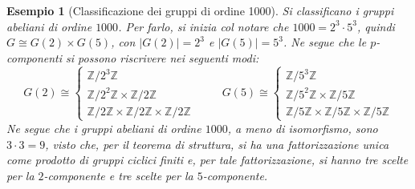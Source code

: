\documentclass[11pt]{article}
\theoremstyle{style}
\newtheorem{esempio}{Esempio}[section]
\numberwithin{equation}{subsection}
\begin{document}
\begin{esempio}
	[Classificazione dei gruppi di ordine 1000]
Si classificano i gruppi abeliani di ordine $1000$.
Per farlo, si inizia col notare che $1000 = 2^3 \cdot 5^3$, quindi $G \cong G(2) \times G(5)$, con $\lvert G(2) \rvert = 2^3$ e $\lvert G(5) \rvert =5^3$.
Ne segue che le $p$-componenti si possono riscrivere nei seguenti modi:
\[
G(2) \cong \begin{cases}
	\mathbb{Z}/2^3\mathbb{Z}\\
	\mathbb{Z}/2^2 \mathbb{Z} \times \mathbb{Z}/2\mathbb{Z}\\
	\mathbb{Z}/2\mathbb{Z} \times \mathbb{Z}/2\mathbb{Z} \times \mathbb{Z}/2\mathbb{Z}
\end{cases}\hspace{1cm}G(5) \cong \begin{cases}
	\mathbb{Z}/5^3\mathbb{Z}\\
	\mathbb{Z}/5^2 \mathbb{Z} \times \mathbb{Z}/5\mathbb{Z}\\
	\mathbb{Z}/5\mathbb{Z} \times \mathbb{Z}/5\mathbb{Z} \times \mathbb{Z}/5\mathbb{Z}
\end{cases}
\] 
Ne segue che i gruppi abeliani di ordine $1000$, a meno di isomorfismo, sono $3\cdot 3 = 9$, visto che, per il teorema di struttura, si ha una fattorizzazione unica come prodotto di gruppi ciclici finiti e, per tale fattorizzazione, si hanno tre scelte per la $2$-componente e tre scelte per la $5$-componente.
\end{esempio}
\end{document}
